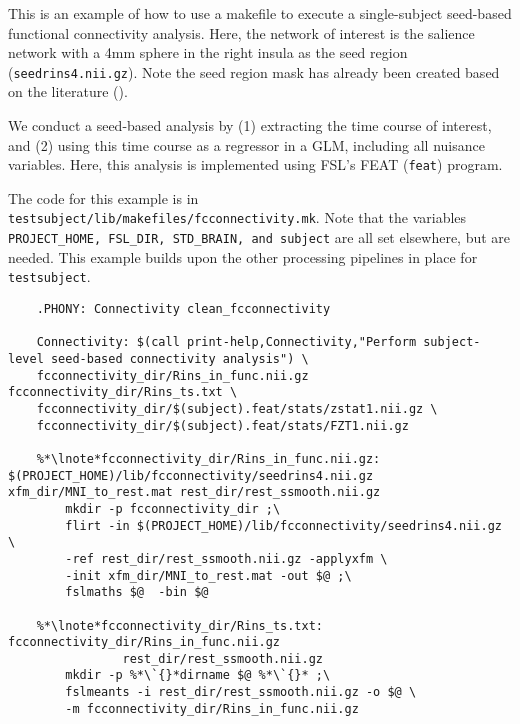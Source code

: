 \label{example:fcconnectivity}
This is an example of how to use a makefile to execute a
single-subject seed-based functional connectivity analysis. Here, the network of interest is the salience network with a 4mm sphere in the right insula as the seed region (\texttt{seedrins4.nii.gz}). Note the seed region mask has already been created based on the literature (\cite{seely2008,lee2014}).

We conduct a seed-based analysis by (1) extracting the time course of
interest, and (2) using this time course as a regressor in a GLM,
including all nuisance variables. Here, this analysis is implemented
using FSL's FEAT (\texttt{feat}) program.


The code for this example is in \texttt{testsubject/lib/makefiles/fcconnectivity.mk}.
Note that the variables \texttt{PROJECT_HOME, FSL_DIR, STD_BRAIN, and subject} are all set elsewhere, but are needed.  This example builds upon the other processing pipelines in place for \texttt{testsubject}.

\begin{lstlisting}
	.PHONY: Connectivity clean_fcconnectivity

	Connectivity: $(call print-help,Connectivity,"Perform subject-level seed-based connectivity analysis") \
	fcconnectivity_dir/Rins_in_func.nii.gz fcconnectivity_dir/Rins_ts.txt \
	fcconnectivity_dir/$(subject).feat/stats/zstat1.nii.gz \
	fcconnectivity_dir/$(subject).feat/stats/FZT1.nii.gz

	%*\lnote*fcconnectivity_dir/Rins_in_func.nii.gz: $(PROJECT_HOME)/lib/fcconnectivity/seedrins4.nii.gz xfm_dir/MNI_to_rest.mat rest_dir/rest_ssmooth.nii.gz
		mkdir -p fcconnectivity_dir ;\
		flirt -in $(PROJECT_HOME)/lib/fcconnectivity/seedrins4.nii.gz \
		-ref rest_dir/rest_ssmooth.nii.gz -applyxfm \
		-init xfm_dir/MNI_to_rest.mat -out $@ ;\
		fslmaths $@  -bin $@ 
	
	%*\lnote*fcconnectivity_dir/Rins_ts.txt: fcconnectivity_dir/Rins_in_func.nii.gz 
				rest_dir/rest_ssmooth.nii.gz
		mkdir -p %*\`{}*dirname $@ %*\`{}* ;\
		fslmeants -i rest_dir/rest_ssmooth.nii.gz -o $@ \
		-m fcconnectivity_dir/Rins_in_func.nii.gz

\end{lstlisting}

